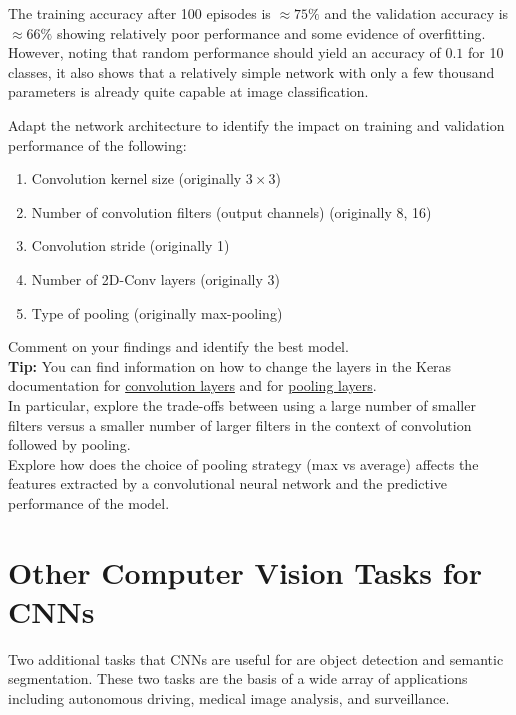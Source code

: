 The training accuracy after 100 episodes is $\approx 75\%$ and the validation accuracy is $\approx 66\%$ showing relatively poor performance and some evidence of overfitting. However, noting that random performance should yield an accuracy of $0.1$ for 10 classes, it also shows that a relatively simple network with only a few thousand parameters is already quite capable at image classification. 

\begin{exercisebox}
Adapt the network architecture to identify the impact on training and validation performance of the following:
   \begin{enumerate}
      \item Convolution kernel size (originally $3 \times 3$)
      \item Number of convolution filters (output channels) (originally 8, 16)
      \item Convolution stride (originally 1)
      \item Number of 2D-Conv layers (originally 3)
      \item Type of pooling (originally max-pooling)
   \end{enumerate} 
Comment on your findings and identify the best model.\\

\textbf{Tip:} You can find information on how to change the layers in the Keras documentation for \href{https://keras.io/2.16/api/layers/convolution_layers/}{convolution layers} and for \href{https://keras.io/2.16/api/layers/pooling_layers/}{pooling layers}. \\

In particular, explore the trade-offs between using a large number of smaller filters versus a smaller number of larger filters in the context of convolution followed by pooling. \\

Explore how does the choice of pooling strategy (max vs average) affects the features extracted by a convolutional neural network and the predictive performance of the model.\\
\end{exercisebox}

\section{Other Computer Vision Tasks for CNNs}

Two additional tasks that CNNs are useful for are object detection and semantic segmentation. These two tasks are the basis of a wide array of applications including autonomous driving, medical image analysis, and surveillance. 

